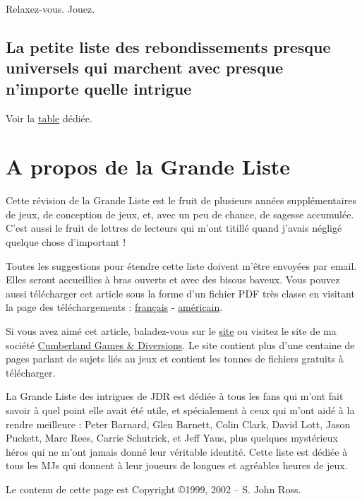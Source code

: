 \begin{multicols}{2}
Relaxez-vous. Jouez.

\subsection*{La petite liste des rebondissements presque universels qui marchent avec presque n'importe quelle intrigue}

Voir la \hyperlink{petiteliste}{table} dédiée.

\section*{A propos de la Grande Liste}

Cette révision de la Grande Liste est le fruit de plusieurs années supplémentaires de jeux, de conception de jeux, et, avec un peu de chance, de sagesse accumulée. C'est aussi le fruit de lettres de lecteurs qui m'ont titillé quand j'avais négligé quelque chose d'important !

Toutes les suggestions pour étendre cette liste doivent m'être envoyées par email. Elles seront accueillies à bras ouverts et avec des bisous baveux. Vous pouvez aussi télécharger cet article sous la forme d'un fichier PDF très classe en visitant la page des téléchargements : \href{https://rouboudou.itch.io/la-grande-liste-des-intrigues-de-jdr}{français} - \href{https://ghalev.itch.io/big-list-of-rpg-plots}{américain}.

Si vous avez aimé cet article, baladez-vous sur le \href{https://rolltop-indigo.blogspot.com/}{site} ou visitez le site de ma société \href{https://ghalev.itch.io/}{Cumberland Games \& Diversions}. Le site contient plus d'une centaine de pages parlant de sujets liés au jeux et contient les tonnes de fichiers gratuits à télécharger.

La Grande Liste des intrigues de JDR est dédiée à tous les fans qui m'ont fait savoir à quel point elle avait été utile, et spécialement à ceux qui m'ont aidé à la rendre meilleure : Peter Barnard, Glen Barnett, Colin Clark, David Lott, Jason Puckett, Marc Rees, Carrie Schutrick, et Jeff Yaus, plus quelques mystérieux héros qui ne m'ont jamais donné leur véritable identité. Cette liste est dédiée à tous les MJs qui donnent à leur joueurs de longues et agréables heures de jeux.

Le contenu de cette page est Copyright \copyright1999, 2002 -- S. John Ross.

\end{multicols}

